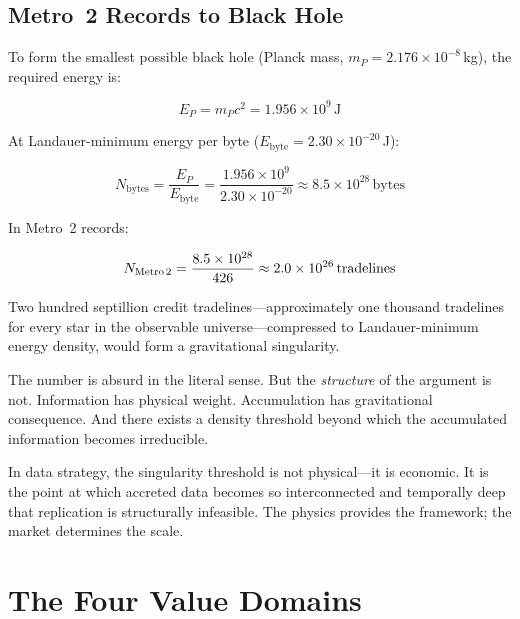 \documentclass[11pt,twocolumn]{article}
\begin{document}
\subsection{Metro~2 Records to Black Hole}

To form the smallest possible black hole (Planck mass, $m_P = 2.176 \times 10^{-8}$\,kg), the required energy is:

\begin{equation}
E_P = m_P c^2 = 1.956 \times 10^{9}\,\text{J}
\end{equation}

At Landauer-minimum energy per byte ($E_{\text{byte}} = 2.30 \times 10^{-20}$\,J):

\begin{equation}
N_{\text{bytes}} = \frac{E_P}{E_{\text{byte}}} = \frac{1.956 \times 10^{9}}{2.30 \times 10^{-20}} \approx 8.5 \times 10^{28}\,\text{bytes}
\end{equation}

In Metro~2 records:

\begin{equation}
N_{\text{Metro\,2}} = \frac{8.5 \times 10^{28}}{426} \approx 2.0 \times 10^{26}\,\text{tradelines}
\end{equation}

Two hundred septillion credit tradelines---approximately one thousand tradelines for every star in the observable universe---compressed to Landauer-minimum energy density, would form a gravitational singularity.

The number is absurd in the literal sense. But the \emph{structure} of the argument is not. Information has physical weight. Accumulation has gravitational consequence. And there exists a density threshold beyond which the accumulated information becomes irreducible.

In data strategy, the singularity threshold is not physical---it is economic. It is the point at which accreted data becomes so interconnected and temporally deep that replication is structurally infeasible. The physics provides the framework; the market determines the scale.

\section{The Four Value Domains}
\end{document}
